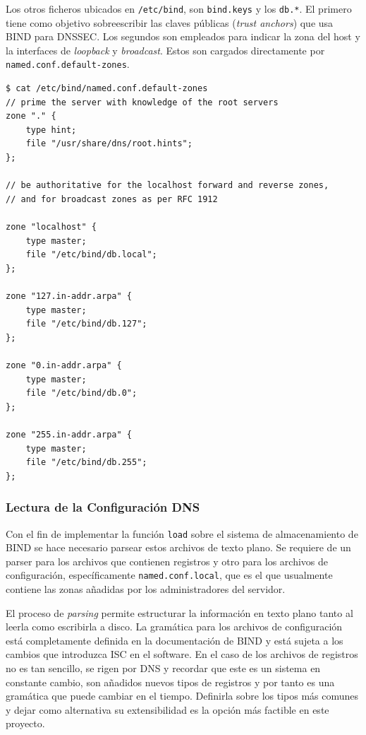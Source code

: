 Los otros ficheros ubicados en \verb+/etc/bind+, son \verb+bind.keys+ y los \verb+db.*+. El primero tiene como objetivo sobreescribir las claves públicas (\textit{trust anchors}) que usa BIND para DNSSEC. Los segundos son empleados para indicar la zona del host y la interfaces de \textit{loopback} y \textit{broadcast}. Estos son cargados directamente por \verb+named.conf.default-zones+.

\begin{lstlisting}[frame=single, numbers=none, caption=Contenido del fichero \textbf{named.conf.default-zones}]
$ cat /etc/bind/named.conf.default-zones
// prime the server with knowledge of the root servers
zone "." {
    type hint;
    file "/usr/share/dns/root.hints";
};

// be authoritative for the localhost forward and reverse zones,
// and for broadcast zones as per RFC 1912

zone "localhost" {
    type master;
    file "/etc/bind/db.local";
};

zone "127.in-addr.arpa" {
    type master;
    file "/etc/bind/db.127";
};

zone "0.in-addr.arpa" {
    type master;
    file "/etc/bind/db.0";
};

zone "255.in-addr.arpa" {
    type master;
    file "/etc/bind/db.255";
};
\end{lstlisting}

\subsubsection{Lectura de la Configuración DNS}

Con el fin de implementar la función \verb+load+ sobre el sistema de almacenamiento de BIND se hace necesario parsear estos archivos de texto plano. Se requiere de un parser para los archivos que contienen registros y otro para los archivos de configuración, específicamente \verb+named.conf.local+, que es el que usualmente contiene las zonas añadidas por los administradores del servidor.

El proceso de \textit{parsing} permite estructurar la información en texto plano tanto al leerla como escribirla a disco. La gramática para los archivos de configuración está completamente definida en la documentación de BIND y está sujeta a los cambios que introduzca ISC en el software. En el caso de los archivos de registros no es tan sencillo, se rigen por DNS y recordar que este es un sistema en constante cambio, son añadidos nuevos tipos de registros y por tanto es una gramática que puede cambiar en el tiempo. Definirla sobre los tipos más comunes y dejar como alternativa su extensibilidad es la opción más factible en este proyecto.

